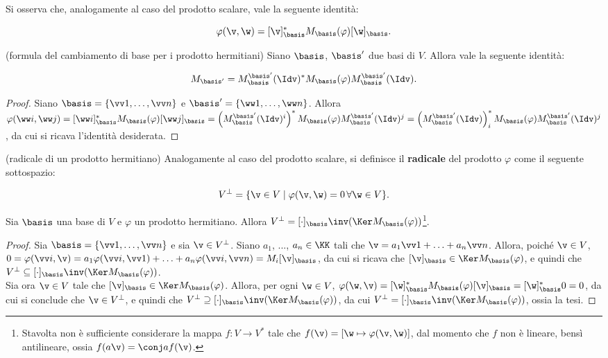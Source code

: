 \documentclass[11pt]{article}
\begin{document}
	\begin{remark}
		Si osserva che, analogamente al caso del prodotto scalare, vale
		la seguente identità:
		
		\[ \varphi(\v, \w) = [\v]_\basis^* M_\basis(\varphi) [\w]_\basis. \]
	\end{remark}
	
	\begin{proposition}
		(formula del cambiamento di base per i prodotto hermitiani) Siano
		$\basis$, $\basis'$ due basi di $V$. Allora vale la seguente
		identità:
		
		\[ M_{\basis'} = M_{\basis}^{\basis'}(\Idv)^* M_\basis(\varphi) M_{\basis}^{\basis'}(\Idv). \]
	\end{proposition}

	\begin{proof}
		Siano $\basis = \{ \vv 1, \ldots, \vv n \}$ e $\basis' = \{ \ww 1, \ldots, \ww n \}$. Allora $\varphi(\ww i, \ww j) = [\ww i]_\basis^* M_\basis(\varphi) [\ww j]_\basis = \left( M_\basis^{\basis'}(\Idv)^i \right)^* M_\basis(\varphi) M_\basis^{\basis'}(\Idv)^j =
		\left(M_\basis^{\basis'}(\Idv)\right)^*_i M_\basis(\varphi) M_\basis^{\basis'}(\Idv)^j$, da cui si ricava l'identità
		desiderata.
	\end{proof}

	\begin{definition} (radicale di un prodotto hermitiano)
		Analogamente al caso del prodotto scalare, si definisce il \textbf{radicale} del prodotto $\varphi$ come il seguente sottospazio: 
		
		\[ V^\perp = \{ \v \in V \mid \varphi(\v, \w) = 0 \, \forall \w \in V \}. \]
	\end{definition}

	\begin{proposition}
		Sia $\basis$ una base di $V$ e $\varphi$ un prodotto hermitiano. Allora $V^\perp = [\cdot]_\basis \inv (\Ker M_\basis(\varphi))$\footnote{Stavolta non è sufficiente considerare la mappa $f : V \to V^*$ tale che $f(\v) = \left[ \w \mapsto \varphi(\v, \w) \right]$, dal momento che $f$ non è lineare, bensì antilineare, ossia $f(a \v) = \conj a f(\v)$.}.
	\end{proposition}

	\begin{proof}
		Sia $\basis = \{ \vv 1, \ldots, \vv n \}$ e sia $\v \in V^\perp$.
		Siano $a_1$, ..., $a_n \in \KK$ tali che $\v = a_1 \vv 1 + \ldots + a_n \vv n$. Allora, poiché $\v \in V$, $0 = \varphi(\vv i, \v)
		= a_1 \varphi(\vv i, \vv 1) + \ldots + a_n \varphi(\vv i, \vv n) = M_i [\v]_\basis$, da cui si ricava che $[\v]_\basis \in \Ker M_\basis(\varphi)$, e quindi che $V^\perp \subseteq [\cdot]_\basis \inv (\Ker M_\basis(\varphi))$. \\
		
		Sia ora $\v \in V$ tale che $[\v]_\basis \in \Ker M_\basis(\varphi)$.
		Allora, per ogni $\w \in V$, $\varphi(\w, \v) = [\w]_\basis^* M_\basis(\varphi) [\v]_\basis = [\w]_\basis^* 0 = 0$, da cui si
		conclude che $\v \in V^\perp$, e quindi che  $V^\perp \supseteq [\cdot]_\basis \inv (\Ker M_\basis(\varphi))$, da cui
		$V^\perp = [\cdot]_\basis \inv (\Ker M_\basis(\varphi))$, ossia
		la tesi.
	\end{proof}
\end{document}
